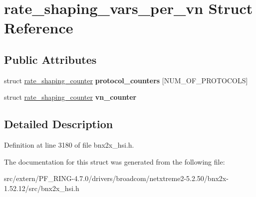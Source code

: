 \hypertarget{structrate__shaping__vars__per__vn}{
\section{rate\_\-shaping\_\-vars\_\-per\_\-vn Struct Reference}
\label{structrate__shaping__vars__per__vn}
}
\subsection*{Public Attributes}
\begin{DoxyCompactItemize}
\item 
\hypertarget{structrate__shaping__vars__per__vn_a59162873a0e20ec60bfe7a6ebe68fc77}{
struct \hyperlink{structrate__shaping__counter}{rate\_\-shaping\_\-counter} {\bfseries protocol\_\-counters} \mbox{[}NUM\_\-OF\_\-PROTOCOLS\mbox{]}}
\label{structrate__shaping__vars__per__vn_a59162873a0e20ec60bfe7a6ebe68fc77}

\item 
\hypertarget{structrate__shaping__vars__per__vn_a2d362fb07eb9441f4bfc15ae7abd6226}{
struct \hyperlink{structrate__shaping__counter}{rate\_\-shaping\_\-counter} {\bfseries vn\_\-counter}}
\label{structrate__shaping__vars__per__vn_a2d362fb07eb9441f4bfc15ae7abd6226}

\end{DoxyCompactItemize}


\subsection{Detailed Description}


Definition at line 3180 of file bnx2x\_\-hsi.h.



The documentation for this struct was generated from the following file:\begin{DoxyCompactItemize}
\item 
src/extern/PF\_\-RING-\/4.7.0/drivers/broadcom/netxtreme2-\/5.2.50/bnx2x-\/1.52.12/src/bnx2x\_\-hsi.h\end{DoxyCompactItemize}
